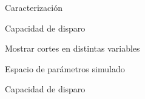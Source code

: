 \begin{frame}{Caracterizaci\'on}
\footnotesize
	\begin{block}{Capacidad de disparo}
		\begin{center}
		Mostrar cortes en distintas variables
		\end{center}
	\end{block}
\end{frame}

\begin{frame}{Espacio de par\'ametros simulado}
\footnotesize
	\begin{block}{Capacidad de disparo}
		\begin{center}
		\end{center}
	\end{block}
\end{frame}